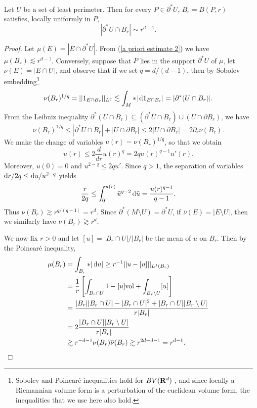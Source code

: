 \begin{proposition}\label{doubling dimension}
Let $U$ be a set of least perimeter. Then for every $P \in \partial^* U$, $B_r = B(P, r)$ satisfies, locally uniformly in $P$,
$$|\partial^* U \cap B_r| \sim r^{d - 1}.$$
\end{proposition}
\begin{proof}
Let $\mu(E) = |E \cap \partial^* U|$. From (\ref{a priori estimate 2}) we have $\mu(B_r) \lesssim r^{d - 1}$.
Conversely, suppose that $P$ lies in the support $\partial^* U$ of $\mu$, let $\nu(E) = |E \cap U|$, and observe that if we set $q = d/(d - 1)$, then by Sobolev embedding\footnote{Sobolev and Poincar\'e inequalities hold for $BV(\mathbf{R}^d)$ \cite[\S5.6.1]{evans1991measure},
and since locally a Riemannian volume form is a perturbation of the euclidean volume form, the inequalities that we use here also hold.}
$$\nu(B_r)^{1/q} = ||1_{E \cap B_r}||_{L^q} \lesssim \int_M *|\mathop{}\!\mathrm{d} 1_{E \cap B_r}| = |\partial^*(U \cap B_r)|.$$
From the Leibniz inequality $\partial^*(U \cap B_r) \subseteq (\partial^* U \cap B_r) \cup (U \cap \partial B_r)$, we have
$$\nu(B_r)^{1/q} \leq |\partial^* U \cap B_r| + |U \cap \partial B_r| \leq 2|U \cap \partial B_r| = 2\partial_r \nu(B_r).$$
We make the change of variables $u(r) = \nu(B_r)^{1/q}$, so that we obtain
$$u(r) \leq 2 \frac{d}{dr} u(r)^q = 2qu(r)^{q - 1}u'(r).$$
Moreover, $u(0) = 0$ and $u^{2 - q} \leq 2qu'$.
Since $q > 1$, the separation of variables $\mathop{}\!\mathrm{d} r/2q \leq \mathop{}\!\mathrm{d} u/u^{2 - q}$ yields
$$\frac{r}{2q} \leq \int_0^{u(r)} \tilde u^{q - 2}\mathop{}\!\mathrm{d} \tilde u = \frac{u(r)^{q - 1}}{q - 1}.$$
Thus $\nu(B_r) \gtrsim r^{q/(q - 1)} = r^d$.
Since $\partial^* (M \setminus U) = \partial^* U$, if $\overline{\nu}(E) = |E \setminus U|$, then we similarly have $\overline{\nu}(B_r) \gtrsim r^d$.

We now fix $r > 0$ and let $[u] = |B_r \cap U|/|B_r|$ be the mean of $u$ on $B_r$. Then by the Poincar\'e inequality,
\begin{align*}
\mu(B_r) &= \int_{B_r} *|\mathop{}\!\mathrm{d} u| \geq r^{-1} ||u - [u]||_{L^1(B_r)} \\
&= \frac{1}{r} \left[\int_{B_r \cap U} 1 - [u] \mathrm{vol} + \int_{B_r \setminus U} [u] \right] \\
&= \frac{|B_r||B_r \cap U| - |B_r \cap U|^2 + |B_r \cap U||B_r \setminus U|}{r|B_r|} \\
&= 2\frac{|B_r \cap U||B_r \setminus U|}{r|B_r|}\\
&\gtrsim r^{-d-1} \nu(B_r) \overline{\nu}(B_r) \gtrsim r^{2d-d-1} = r^{d - 1}. \qedhere
\end{align*}
\end{proof}


